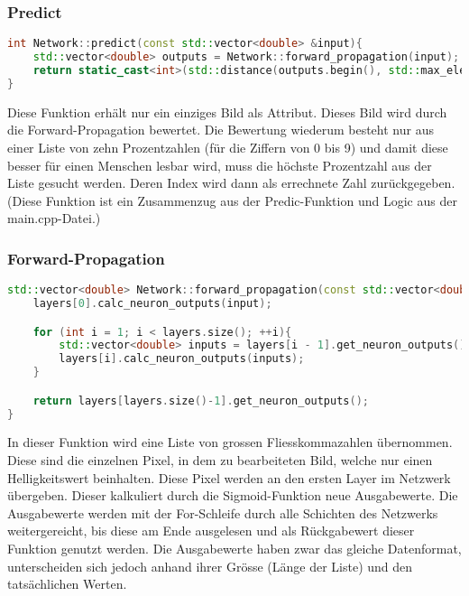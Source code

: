 \subsubsection{Predict}
\label{sec:RealPredictCode} %
\begin{lstlisting}[language=C++]
int Network::predict(const std::vector<double> &input){
    std::vector<double> outputs = Network::forward_propagation(input);
    return static_cast<int>(std::distance(outputs.begin(), std::max_element(outputs.begin(), outputs.end())));
}
\end{lstlisting}
Diese Funktion erhält nur ein einziges Bild als Attribut. Dieses Bild wird durch die Forward-Propagation bewertet. Die Bewertung wiederum besteht nur aus einer Liste von zehn Prozentzahlen (für die Ziffern von 0 bis 9) und damit diese besser für einen Menschen lesbar wird, muss die höchste Prozentzahl aus der Liste gesucht werden. Deren Index wird dann als errechnete Zahl zurückgegeben.
\\
(Diese Funktion ist ein Zusammenzug aus der Predic-Funktion und Logic aus der main.cpp-Datei.) %

\subsubsection{Forward-Propagation}
\label{sec:RealForwardPropagationCode}
\begin{lstlisting}[language=C++]
std::vector<double> Network::forward_propagation(const std::vector<double>& input){
    layers[0].calc_neuron_outputs(input);

    for (int i = 1; i < layers.size(); ++i){
        std::vector<double> inputs = layers[i - 1].get_neuron_outputs();
        layers[i].calc_neuron_outputs(inputs);
    }

    return layers[layers.size()-1].get_neuron_outputs();
}
\end{lstlisting}
In dieser Funktion wird eine Liste von grossen Fliesskommazahlen übernommen. Diese sind die einzelnen Pixel, in dem zu bearbeiteten Bild, welche nur einen Helligkeitswert beinhalten. Diese Pixel werden an den ersten Layer im Netzwerk übergeben. Dieser kalkuliert durch die Sigmoid-Funktion neue Ausgabewerte. Die Ausgabewerte werden mit der For-Schleife durch alle Schichten des Netzwerks weitergereicht, bis diese am Ende ausgelesen und als Rückgabewert dieser Funktion genutzt werden. Die Ausgabewerte haben zwar das gleiche Datenformat, unterscheiden sich jedoch anhand ihrer Grösse (Länge der Liste) und den tatsächlichen Werten.

